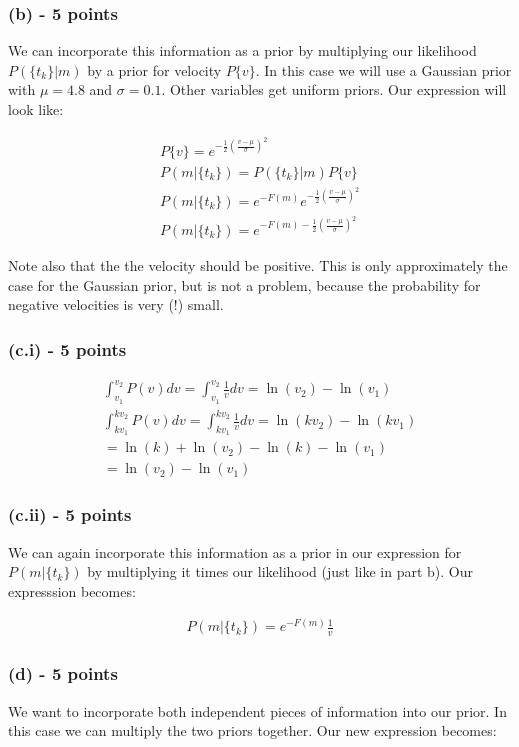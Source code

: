 \documentclass[11pt]{article}
\begin{document}
\subsubsection*{(b) - 5 points}
We can incorporate this information as a prior by multiplying our likelihood $P(\{t_k\}|m)$ by a prior for velocity $P\{v\}$.  In this case we will use a Gaussian prior with $\mu = 4.8$ and $\sigma = 0.1$.  Other variables get uniform priors. Our expression will look like:

\begin{eqnarray*}
P\{v\}=e^{-\frac{1}{2}(\frac{v-\mu}{\sigma})^2} \\
P(m|\{t_k\})=P(\{t_k\}|m)P\{v\} \\
P(m|\{t_k\})=e^{-F(m)}e^{-\frac{1}{2}(\frac{v-\mu}{\sigma})^2} \\
P(m|\{t_k\})=e^{-F(m)-\frac{1}{2}(\frac{v-\mu}{\sigma})^2}
\end{eqnarray*}

Note also that the the velocity should be positive. This is only approximately the case for the Gaussian prior, but is not a problem, because the probability for negative velocities is very (!) small.

\subsubsection*{(c.i) - 5 points}
\begin{eqnarray*}
\int_{v_1}^{v_2} {P(v)dv} = \int_{v_1}^{v_2} {\frac{1}{v}dv} = \ln(v_2) - \ln(v_1) \\
\int_{kv_1}^{kv_2} {P(v)dv} = \int_{kv_1}^{kv_2} {\frac{1}{v}dv} = \ln(kv_2) - \ln(kv_1) \\
= \ln(k)+\ln(v_2)-\ln(k)-\ln(v_1) \\
= \ln(v_2) - \ln(v_1)
\end{eqnarray*}

\subsubsection*{(c.ii) - 5 points}
We can again incorporate this information as a prior in our expression for $P(m|\{t_k\})$ by multiplying it times our likelihood (just like in part b).  Our expresssion becomes:

\begin{eqnarray*}
P(m|\{t_k\}) = e^{-F(m)} \frac{1}{v}
\end{eqnarray*}

\subsubsection*{(d) - 5 points}
We want to incorporate both independent pieces of information into our prior.  In this case we can multiply the two priors together.  Our new expression becomes:
\end{document}
